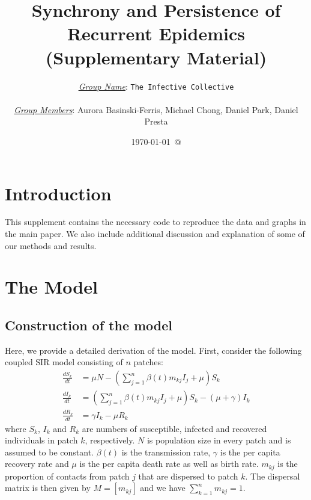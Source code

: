 \documentclass[12pt]{article}\usepackage[]{graphicx}\usepackage[]{color}
\title{Synchrony and Persistence of Recurrent Epidemics (Supplementary Material)}
\author{\underline{\emph{Group Name}}: \texttt{{\color{blue}The Infective Collective}}\\
{}\\
\underline{\emph{Group Members}}: {\color{blue}Aurora Basinski-Ferris, Michael Chong, Daniel Park, Daniel Presta}}
\date{\today\ @ \thistime}
\begin{document}
\linenumbers
\maketitle

\section{Introduction}
This supplement contains the necessary code to reproduce the data and graphs in the main paper. We also include additional discussion and explanation of some of our methods and results.

\section{The Model}

\subsection{Construction of the model}

Here, we provide a detailed derivation of the model.
First, consider the following coupled SIR model consisting of $n$ patches:
\begin{equation}
\begin{aligned}
\frac{dS_k}{dt} &= \mu N - \left(\sum_{j=1}^n \beta(t) m_{kj} I_j + \mu\right) S_k \\
\frac{dI_k}{dt} &= \left(\sum_{j=1}^n \beta(t) m_{kj} I_j + \mu\right) S_k - (\mu  + \gamma) I_k\\
\frac{dR_k}{dt} &= \gamma I_k - \mu R_k
\end{aligned}
\end{equation}
where $S_k$, $I_k$ and $R_k$ are numbers of susceptible, infected and recovered individuals in patch $k$, respectively. 
$N$ is population size in every patch and is assumed to be constant. 
$\beta(t)$ is the transmission rate, $\gamma$ is the per capita recovery rate and $\mu$ is the per capita death rate as well as birth rate. 
$m_{kj}$ is the proportion of contacts from patch $j$ that are dispersed to patch $k$. 
The dispersal matrix is then given by $M = \left[m_{kj}\right]$ and we have $\sum_{k=1}^n m_{kj} = 1$. 
\end{document}
